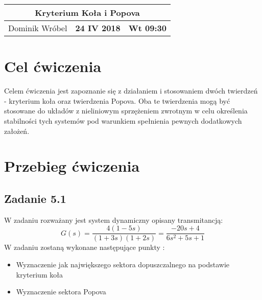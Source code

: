 \documentclass[a4paper,11pt]{article}
\begin{document}
\begin{table}
\begin{center}
\begin{tabular}{|l|l|l|}
\hline
\multicolumn{3}{|c|}{\textbf{Kryterium Koła i Popova}} \\ \hline Dominik Wróbel & \textbf{ 24 IV 2018} & \textbf{Wt 09:30} \\ \hline

\end{tabular}
\end{center}
\end{table}
\tableofcontents
\section{Cel ćwiczenia}
Celem ćwiczenia jest zapoznanie się z działaniem i stosowaniem dwóch twierdzeń - kryterium koła oraz twierdzenia Popova. Oba te twierdzenia mogą być stosowane do układów z nieliniowym sprzężeniem zwrotnym w celu określenia stabilności tych systemów pod warunkiem spełnienia pewnych dodatkowych założeń.  
\section{Przebieg ćwiczenia}
\subsection{Zadanie 5.1}
W zadaniu rozważany jest system dynamiczny opisany transmitancją:
\begin{equation} \label{eq:transfer}
G(s)=\frac{4(1-5s)}{(1+3s)(1+2s)}=\frac{-20s+4}{6s^{2}+5s+1}
\end{equation}
\newpage
W zadaniu zostaną wykonane następujące punkty :
\begin{itemize}
\item Wyznaczenie jak największego sektora dopuszczalnego na podstawie kryterium koła 
\item Wyznaczenie sektora Popova 
\end{itemize}
\end{document}
